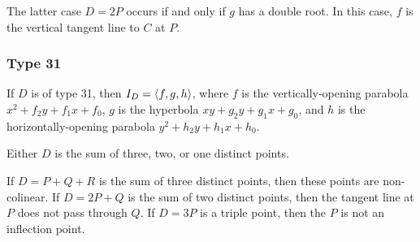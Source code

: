   The latter case $D = 2P$ occurs if and only if $g$ has a double root.
  In this case, $f$ is the vertical tangent line to $C$ at $P$.

\begin{comment}
\subsubsection{Type 21}
  If $D$ is of type 21, then $I_D = \pid{f, g}$, where $f$ is the non-vertical line $y + f_1x + f_0$
  and $g$ is the univariate polynomial $x^2 + g_1x + g_0$.
  Thus $D$ is the sum of two points on the line $f$, whose $x$-coordinates are the roots of $g$.
  
  There are two possibilities.
  If $g$ has two distinct roots, then $D = P + Q$ for two distinct points $P$ and $Q$.
  If $g$ has a double root, then $D = 2P$ and $f$ is the tangent line at $P$.
  
  So either $D$ is the sum of two distinct points with different $x$-coordinates,
  or $D$ is a double point $D = 2P$ and the tangent line at $P$ is non-vertical.
\end{comment}
\begin{comment}
\subsubsection{Type 22}
  If $D$ is of type 21, then $I_D = \pid{f, g}$, where $f$ is the vertical line $x + f_0$
  and $g$ is the univariate polynomial $y^2 + g_2y + g_0$.
  
  Either $D = P + Q$ is the sum of two distinct points with the same $x$-coordinate but different $y$-coordinates,
  or $D = 2P$ is a double point and the tangent line at $P$ is vertical.
\end{comment}

\subsubsection{Type 31}
  If $D$ is of type 31, then $I_D = \left\langle f, g, h \right\rangle$,
  where $f$ is the vertically-opening parabola $x^2 + f_2y + f_1x + f_0$,
  $g$ is the hyperbola $xy + g_2y + g_1x + g_0$,
  and $h$ is the horizontally-opening parabola $y^2 + h_2y + h_1x + h_0$.
  
  Either $D$ is the sum of three, two, or one distinct points.
  
  If $D = P + Q + R$ is the sum of three distinct points, then these points are non-colinear.
  If $D = 2P + Q$ is the sum of two distinct points, then the tangent line at $P$ does not pass through $Q$.
  If $D = 3P$ is a triple point, then the $P$ is not an inflection point.

